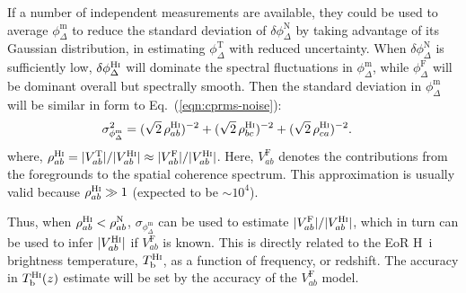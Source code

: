 \documentclass[
reprint,
superscriptaddress,
amsmath,
amssymb,
aps,
prd
]{revtex4-1}
\begin{document}
If a number of independent measurements are available, they could be used to average $\phi_\Delta^\textrm{m}$ to reduce the standard deviation of $\delta\phi_\Delta^\textrm{N}$ by taking advantage of its Gaussian distribution, in estimating $\phi_\Delta^\textrm{T}$ with reduced uncertainty. When $\delta\phi_\Delta^\textrm{N}$ is sufficiently low, $\delta\phi_\Delta^\textrm{H{\sc i}}$ will dominate the spectral fluctuations in $\phi_\Delta^\textrm{m}$, while $\phi_\Delta^\textrm{F}$ will be dominant overall but spectrally smooth. Then the standard deviation in $\phi_\Delta^\textrm{m}$ will be similar in form to Eq.~(\ref{eqn:cprms-noise}):
\begin{align}
  \sigma_{\phi_\Delta^\textrm{m}}^2 &= (\sqrt{2}\,\rho_{ab}^\textrm{H{\sc i}})^{-2}+(\sqrt{2}\,\rho_{bc}^\textrm{H{\sc i}})^{-2}+(\sqrt{2}\,\rho_{ca}^\textrm{H{\sc i}})^{-2}. \label{eqn:cprms-EoR}
\end{align}
where, $\rho_{ab}^\textrm{H{\sc i}} = |V_{ab}^\textrm{T}|/|V_{ab}^\textrm{H{\sc i}}| \approx |V_{ab}^\textrm{F}|/|V_{ab}^\textrm{H{\sc i}}|$. Here, $V_{ab}^\textrm{F}$ denotes the contributions from the foregrounds to the spatial coherence spectrum. This approximation is usually valid because $\rho_{ab}^\textrm{H{\sc i}} \gg 1$ (expected to be $\sim 10^4$). 

Thus, when $\rho_{ab}^\textrm{H{\sc i}} < \rho_{ab}^\textrm{N}$, $\sigma_{\phi_\Delta^\textrm{m}}$ can be used to estimate $|V_{ab}^\textrm{F}|/|V_{ab}^\textrm{H{\sc i}}|$, which in turn can be used to infer $|V_{ab}^\textrm{H{\sc i}}|$ if $V_{ab}^\textrm{F}$ is known. This is directly related to the EoR H~{\sc i} brightness temperature, $T_\textrm{b}^\textrm{H{\sc i}}$, as a function of frequency, or redshift. The accuracy in $T_\textrm{b}^\textrm{H{\sc i}}(z)$ estimate will be set by the accuracy of the $V_{ab}^\textrm{F}$ model.

\end{document}
